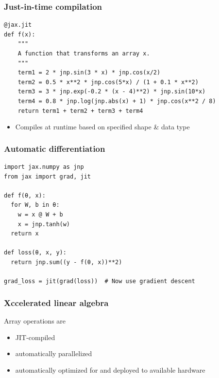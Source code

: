 \begin{frame}[fragile]
    \frametitle{Just-in-time compilation}
    
    \begin{verbatim}
@jax.jit
def f(x):
    """
    A function that transforms an array x.
    """
    term1 = 2 * jnp.sin(3 * x) * jnp.cos(x/2)
    term2 = 0.5 * x**2 * jnp.cos(5*x) / (1 + 0.1 * x**2)
    term3 = 3 * jnp.exp(-0.2 * (x - 4)**2) * jnp.sin(10*x)
    term4 = 0.8 * jnp.log(jnp.abs(x) + 1) * jnp.cos(x**2 / 8)
    return term1 + term2 + term3 + term4 
    \end{verbatim}

            \vspace{0.5em}
            \vspace{0.5em}
    \begin{itemize}
        \item Compiles at runtime based on specified shape \& data type
    \end{itemize}

\end{frame}

\begin{frame}[fragile]
    \frametitle{Automatic differentiation}
    
    \vspace{-1em}
    \begin{verbatim}
import jax.numpy as jnp
from jax import grad, jit

def f(θ, x):
  for W, b in θ:
    w = x @ W + b
    x = jnp.tanh(w)  
  return x

def loss(θ, x, y):
  return jnp.sum((y - f(θ, x))**2)

grad_loss = jit(grad(loss))  # Now use gradient descent 
    \end{verbatim}

\end{frame}


\begin{frame}[fragile]
    \frametitle{Xccelerated linear algebra}

    Array operations are
    \begin{itemize}
        \item JIT-compiled
    \vspace{0.5em}
        \item automatically parallelized
    \vspace{0.5em}
        \item automatically optimized for and deployed to available hardware
    \end{itemize}
    

\end{frame}


